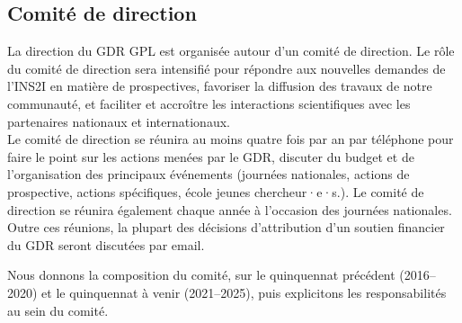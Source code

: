 \documentclass[11pt]{article}
\newcommand{\mynote}[3][black]{\textcolor{#1}{\fbox{\bfseries\sffamily\scriptsize{#2}}
{\small$\blacktriangleright$\textsf{\emph{#3}}$\blacktriangleleft$}}}
\newcommand{\TODO}[1]{\mynote[red]{TODO}{#1}}
\begin{document}


\subsection{Comité de direction}

La direction du GDR GPL est organisée autour d'un comité de direction. 
Le rôle du comité de direction sera intensifié pour répondre aux nouvelles demandes de l'INS2I en matière de prospectives, favoriser la diffusion des travaux de notre communauté, et faciliter et accroître les interactions scientifiques avec les partenaires nationaux et internationaux. \\
Le comité de direction se réunira au moins quatre fois par an par téléphone pour faire le point sur les actions menées par le GDR, discuter du budget et de l'organisation des
principaux événements (journées nationales, actions de prospective, actions
spécifiques, école jeunes chercheur·e·s.). Le comité de direction se réunira
également chaque année à l'occasion des journées nationales. Outre ces réunions, la plupart des décisions d'attribution d'un
soutien financier du GDR seront discutées par email.

Nous donnons la
composition du comité, sur le quinquennat précédent (2016--2020) et le quinquennat à venir
(2021--2025), puis explicitons les responsabilités au sein du comité.
\end{document}
